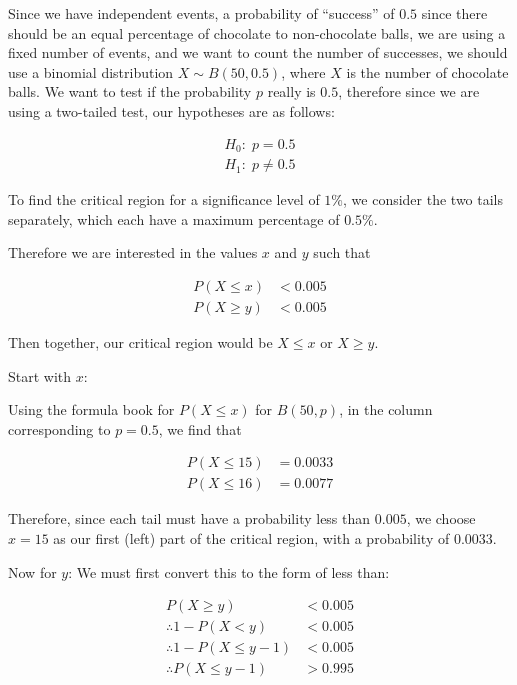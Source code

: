 \begin{solution}
    Since we have independent events, a probability of ``success'' of $0.5$ since there should be an equal percentage of chocolate to non-chocolate balls, we are using a fixed number of events, and we want to count the number of successes, 
    we should use a binomial distribution $X \sim B(50,0.5)$, where $X$ is the number of chocolate balls. We want to test if the probability $p$ really is $0.5$, therefore since we are using a two-tailed test, our hypotheses are as follows:

    \begin{align*}
        H_0 : \; p=0.5 \tag{null hypothesis}\\
        H_1: \; p\neq0.5 \tag{alternative hypothesis}
    \end{align*}

    To find the critical region for a significance level of $1\%$, we consider the two tails separately, which each have a maximum percentage of $0.5\%$.

    Therefore we are interested in the values $x$ and $y$ such that 

    \begin{align*}
        P(X\leq x)&<0.005 \\
        P(X\geq y)&<0.005
    \end{align*}
    
    Then together, our critical region would be $X\leq x$ or $X \geq y$.

    Start with $x$:

    Using the formula book for $P(X\leq x)$ for $B(50,p)$, in the column corresponding to $p=0.5$, we find that 

    \begin{align*}
        P(X\leq 15) &=  0.0033 \\
        P(X \leq 16) &= 0.0077
    \end{align*}

    Therefore, since each tail must have a probability less than $0.005$, we choose $x=15$ as our first (left) part of the critical region, with a probability of $ 0.0033$.

    Now for $y$:
    We must first convert this to the form of less than:

    \begin{align*}
        P(X\ge y) &< 0.005\\
        \therefore 1-P(X< y) &< 0.005\\
        \therefore 1-P(X\le y-1) &< 0.005\\
        \therefore P(X\le y-1) &> 0.995
    \end{align*}


\end{solution}
